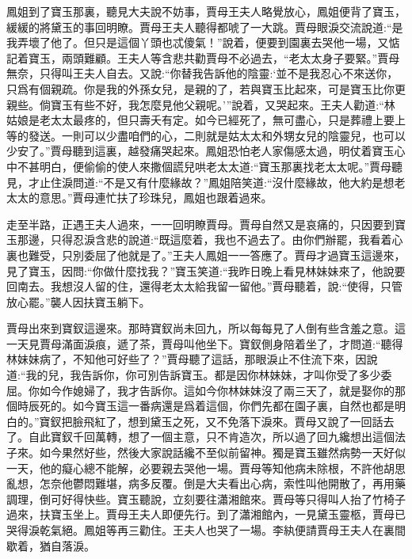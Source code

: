 \begin{parag}
    鳳姐到了寶玉那裏，聽見大夫說不妨事，賈母王夫人略覺放心，鳳姐便背了寶玉，緩緩的將黛玉的事回明瞭。賈母王夫人聽得都唬了一大跳。賈母眼淚交流說道:“是我弄壞了他了。但只是這個丫頭也忒傻氣！”說着，便要到園裏去哭他一場，又惦記着寶玉，兩頭難顧。王夫人等含悲共勸賈母不必過去，“老太太身子要緊。”賈母無奈，只得叫王夫人自去。又說:“你替我告訴他的陰靈:‘並不是我忍心不來送你，只爲有個親疏。你是我的外孫女兒，是親的了，若與寶玉比起來，可是寶玉比你更親些。倘寶玉有些不好，我怎麼見他父親呢。’”說着，又哭起來。王夫人勸道:“林姑娘是老太太最疼的，但只壽夭有定。如今已經死了，無可盡心，只是葬禮上要上等的發送。一則可以少盡咱們的心，二則就是姑太太和外甥女兒的陰靈兒，也可以少安了。”賈母聽到這裏，越發痛哭起來。鳳姐恐怕老人家傷感太過，明仗着寶玉心中不甚明白，便偷偷的使人來撒個謊兒哄老太太道:“寶玉那裏找老太太呢。”賈母聽見，才止住淚問道:“不是又有什麼緣故？”鳳姐陪笑道:“沒什麼緣故，他大約是想老太太的意思。”賈母連忙扶了珍珠兒，鳳姐也跟着過來。
\end{parag}


\begin{parag}
    走至半路，正遇王夫人過來，一一回明瞭賈母。賈母自然又是哀痛的，只因要到寶玉那邊，只得忍淚含悲的說道:“既這麼着，我也不過去了。由你們辦罷，我看着心裏也難受，只別委屈了他就是了。”王夫人鳳姐一一答應了。賈母才過寶玉這邊來，見了寶玉，因問:“你做什麼找我？”寶玉笑道:“我昨日晚上看見林妹妹來了，他說要回南去。我想沒人留的住，還得老太太給我留一留他。”賈母聽着，說:“使得，只管放心罷。”襲人因扶寶玉躺下。
\end{parag}


\begin{parag}
    賈母出來到寶釵這邊來。那時寶釵尚未回九，所以每每見了人倒有些含羞之意。這一天見賈母滿面淚痕，遞了茶，賈母叫他坐下。寶釵側身陪着坐了，才問道:“聽得林妹妹病了，不知他可好些了？”賈母聽了這話，那眼淚止不住流下來，因說道:“我的兒，我告訴你，你可別告訴寶玉。都是因你林妹妹，才叫你受了多少委屈。你如今作媳婦了，我才告訴你。這如今你林妹妹沒了兩三天了，就是娶你的那個時辰死的。如今寶玉這一番病還是爲着這個，你們先都在園子裏，自然也都是明白的。”寶釵把臉飛紅了，想到黛玉之死，又不免落下淚來。賈母又說了一回話去了。自此寶釵千回萬轉，想了一個主意，只不肯造次，所以過了回九纔想出這個法子來。如今果然好些，然後大家說話纔不至似前留神。獨是寶玉雖然病勢一天好似一天，他的癡心總不能解，必要親去哭他一場。賈母等知他病未除根，不許他胡思亂想，怎奈他鬱悶難堪，病多反覆。倒是大夫看出心病，索性叫他開散了，再用藥調理，倒可好得快些。寶玉聽說，立刻要往瀟湘館來。賈母等只得叫人抬了竹椅子過來，扶寶玉坐上。賈母王夫人即便先行。到了瀟湘館內，一見黛玉靈柩，賈母已哭得淚乾氣絕。鳳姐等再三勸住。王夫人也哭了一場。李紈便請賈母王夫人在裏間歇着，猶自落淚。
\end{parag}


